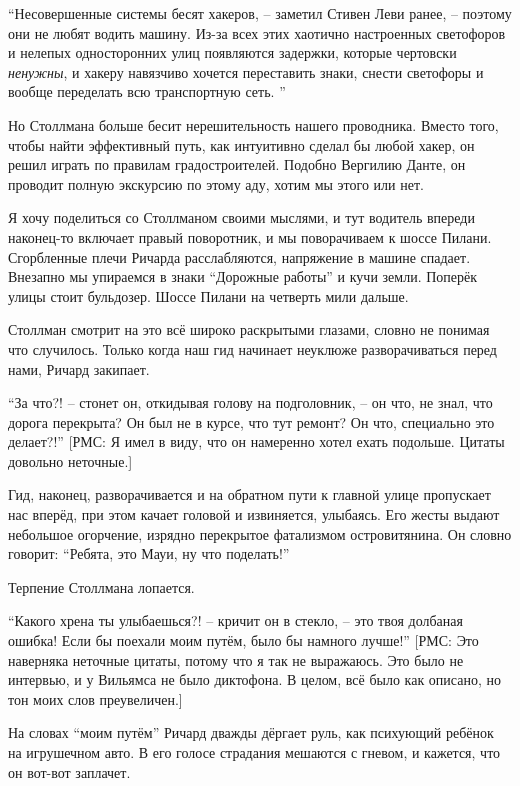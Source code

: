 \enquote{Несовершенные системы бесят хакеров, -- заметил Стивен Леви ранее, -- поэтому они не любят водить машину. Из-за всех этих хаотично настроенных светофоров и нелепых односторонних улиц появляются задержки, которые чертовски \textit{ненужны}, и хакеру навязчиво хочется переставить знаки, снести светофоры и вообще переделать всю транспортную сеть. }

Но Столлмана больше бесит нерешительность нашего проводника. Вместо того, чтобы найти эффективный путь, как интуитивно сделал бы любой хакер, он решил играть по правилам градостроителей. Подобно Вергилию Данте, он проводит полную экскурсию по этому аду, хотим мы этого или нет.

Я хочу поделиться со Столлманом своими мыслями, и тут водитель впереди наконец-то включает правый поворотник, и мы поворачиваем к шоссе Пилани. Сгорбленные плечи Ричарда расслабляются, напряжение в машине спадает. Внезапно мы упираемся в знаки \enquote{Дорожные работы} и кучи земли. Поперёк улицы стоит бульдозер. Шоссе Пилани на четверть мили дальше.

Столлман смотрит на это всё широко раскрытыми глазами, словно не понимая что случилось. Только когда наш гид начинает неуклюже разворачиваться перед нами, Ричард закипает.

\enquote{За что?! -- стонет он, откидывая голову на подголовник, -- он что, не знал, что дорога перекрыта? Он был не в курсе, что тут ремонт? Он что, специально это делает?!} [РМС: Я имел в виду, что он намеренно хотел ехать подольше. Цитаты довольно неточные.]

Гид, наконец, разворачивается и на обратном пути к главной улице пропускает нас вперёд, при этом качает головой и извиняется, улыбаясь. Его жесты выдают небольшое огорчение, изрядно перекрытое фатализмом островитянина. Он словно говорит: \enquote{Ребята, это Мауи, ну что поделать!}

Терпение Столлмана лопается.

\enquote{Какого хрена ты улыбаешься?! -- кричит он в стекло, -- это твоя долбаная ошибка! Если бы поехали моим путём, было бы намного лучше!} [РМС: Это наверняка неточные цитаты, потому что я так не выражаюсь. Это было не интервью, и у Вильямса не было диктофона. В целом, всё было как описано, но тон моих слов преувеличен.]

На словах \enquote{моим путём} Ричард дважды дёргает руль, как психующий ребёнок на игрушечном авто. В его голосе страдания мешаются с гневом, и кажется, что он вот-вот заплачет.

